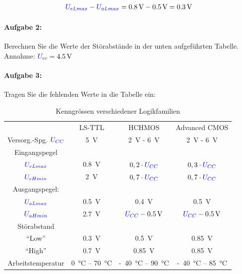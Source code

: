 \documentclass[11pt,a4paper,titlepage]{scrreprt}
\begin{document}
        \begin{align*}
          \textcolor{blue}{U_{eLmax}} - \textcolor{blue}{U_{aLmax}} = \SI{0,8}{\volt} - \SI{0,5}{\volt} = \SI{0,3}{\volt}
        \end{align*}

      \paragraph{Aufgabe 2:} Berechnen Sie die Werte der Störabstände in der unten aufgeführten Tabelle.\\
        Annahme: $\textcolor{blue}{U_{cc}} = \SI{4,5}{\volt}$

      \paragraph{Aufgabe 3:} Tragen Sie die fehlenden Werte in die Tabelle ein:

        \begin{center}
          \begin{table}[!hbtp]
            \caption{Kenngrössen verschiedener Logikfamilien}
              \label{tbl:Kenngroessen}
              \renewcommand{\arraystretch}{1.3}
              \begin{center}
                \begin{tabular}{c| ccc}
                  & LS-TTL & HCHMOS & Advanced CMOS\\
                  Versorg.-Spg. $\textcolor{blue}{U_{CC}}$ & \SI{5}{\volt} & \SI{2}{\volt} - \SI{6}{\volt} & \SI{2}{\volt} - \SI{6}{\volt}\\ \hline
                  Eingangspegel &&&\\
                  $\textcolor{blue}{U_{eLmax}}$&\SI{0,8}{\volt} & $ 0,2 \cdot \textcolor{blue}{U_{CC}}$ &$ 0,3 \cdot \textcolor{blue}{U_{CC}}$ \\
                  $\textcolor{blue}{U_{eHmin}}$&\SI{2}{\volt} &$ 0,7 \cdot \textcolor{blue}{U_{CC}}$ &$ 0,7 \cdot \textcolor{blue}{U_{CC}}$ \\
                  Ausgangspegel:&&& \\
                  $\textcolor{blue}{U_{aLmax}}$&\SI{0,5}{\volt} &\SI{0,4}{\volt} &\SI{0,5}{\volt} \\
                  $\textcolor{blue}{U_{aHmin}}$&\SI{2,7}{\volt} &$\textcolor{blue}{U_{CC}} - \SI{0,5}{\volt}$ &$\textcolor{blue}{U_{CC}} - \SI{0,5}{\volt}$\\ \hline
                  Störabstand &&&\\
                  "`Low"' &\SI{0,3}{\volt} &\SI{0,5}{\volt} &\SI{0,85}{\volt} \\
                  "`High"' &\SI{0,7}{\volt} &\SI{0,85}{\volt} & \SI{0,85}{\volt}\\ \hline
                  Arbeitstemperatur & \SI{0}{\degreeCelsius} -- \SI{70}{\degreeCelsius} & \SI{40}[-]{\degreeCelsius} -- \SI{90}{\degreeCelsius} & \SI{40}[-]{\degreeCelsius} -- \SI{85}{\degreeCelsius}
                \end{tabular}
              \end{center}
          \end{table}
        \end{center}
\end{document}
